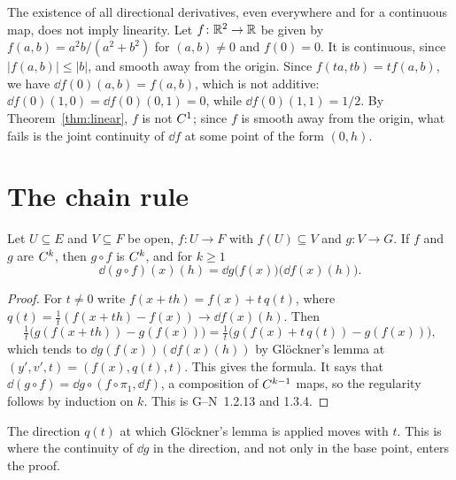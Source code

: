 \begin{example}
  \label{ex:not-linear}
  The existence of all directional derivatives, even everywhere and for a continuous map, does
  not imply linearity. Let $f \colon \mathbb{R}^2 \to \mathbb{R}$ be given by $f(a, b) = a^2 b/(a^2 + b^2)$ for
  $(a,b) \neq 0$ and $f(0) = 0$. It is continuous, since $|f(a,b)| \leq |b|$, and smooth away
  from the origin. Since $f(t a, t b) = t f(a, b)$, we have $\dd f(0)(a, b) = f(a, b)$, which
  is not additive: $\dd f(0)(1,0) = \dd f(0)(0,1) = 0$, while $\dd f(0)(1,1) = 1/2$. By
  Theorem~\ref{thm:linear}, $f$ is not $C^{1}$; since $f$ is smooth away from the origin,
  what fails is the joint continuity of $\dd f$ at some point of the form $(0, h)$.
\end{example}

\section{The chain rule}

\begin{theorem}
  \label{thm:chain-rule}
  \leanok
  Let $U \subseteq E$ and $V \subseteq F$ be open, $f \colon U \to F$ with $f(U) \subseteq V$
  and $g \colon V \to G$. If $f$ and $g$ are $C^{k}$, then $g \circ f$ is $C^{k}$, and for
  $k \geq 1$
  \[
    \dd (g \circ f)(x)(h) = \dd g\bigl(f(x)\bigr)\bigl(\dd f(x)(h)\bigr) .
  \]
\end{theorem}

\begin{proof}
  \leanok
  For $t \neq 0$ write $f(x + th) = f(x) + t\, q(t)$, where
  $q(t) = \frac{1}{t}(f(x + th) - f(x)) \to \dd f(x)(h)$. Then
  \[
    \tfrac{1}{t}\bigl(g(f(x + th)) - g(f(x))\bigr)
    = \tfrac{1}{t}\bigl(g(f(x) + t\, q(t)) - g(f(x))\bigr),
  \]
  which tends to $\dd g(f(x))(\dd f(x)(h))$ by Glöckner's lemma at
  $(y', v', t) = (f(x), q(t), t)$. This gives the formula. It says that
  $\dd (g \circ f) = \dd g \circ (f \circ \pi_1, \dd f)$, a composition of $C^{k-1}$ maps, so
  the regularity follows by induction on $k$. This is G--N~1.2.13 and 1.3.4.
\end{proof}

\begin{remark}
  The direction $q(t)$ at which Glöckner's lemma is applied moves with $t$. This is where the
  continuity of $\dd g$ in the direction, and not only in the base point, enters the proof.
\end{remark}

